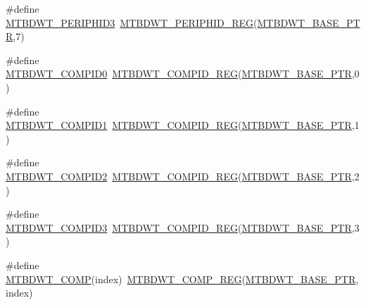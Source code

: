\begin{DoxyCompactItemize}
\item 
\#define \hyperlink{group___m_t_b_d_w_t___register___accessor___macros_ga6496ee3e7267206af1ef1f6118c0bbcf}{M\+T\+B\+D\+W\+T\+\_\+\+P\+E\+R\+I\+P\+H\+I\+D3}~\hyperlink{group___m_t_b_d_w_t___register___accessor___macros_ga91f7c6dfb35fc0d26fb6b3fae63757fc}{M\+T\+B\+D\+W\+T\+\_\+\+P\+E\+R\+I\+P\+H\+I\+D\+\_\+\+R\+EG}(\hyperlink{group___m_t_b_d_w_t___peripheral_ga97d048bfb5a11293a38c444b8347ff42}{M\+T\+B\+D\+W\+T\+\_\+\+B\+A\+S\+E\+\_\+\+P\+TR},7)
\item 
\#define \hyperlink{group___m_t_b_d_w_t___register___accessor___macros_gabea41b046757f76e965573ba1205b5b2}{M\+T\+B\+D\+W\+T\+\_\+\+C\+O\+M\+P\+I\+D0}~\hyperlink{group___m_t_b_d_w_t___register___accessor___macros_gaaeee0c6c32b2caddaf8ec3a96b430de0}{M\+T\+B\+D\+W\+T\+\_\+\+C\+O\+M\+P\+I\+D\+\_\+\+R\+EG}(\hyperlink{group___m_t_b_d_w_t___peripheral_ga97d048bfb5a11293a38c444b8347ff42}{M\+T\+B\+D\+W\+T\+\_\+\+B\+A\+S\+E\+\_\+\+P\+TR},0)
\item 
\#define \hyperlink{group___m_t_b_d_w_t___register___accessor___macros_gad1e9f6c3c5eeeeab187787e6eff15d4e}{M\+T\+B\+D\+W\+T\+\_\+\+C\+O\+M\+P\+I\+D1}~\hyperlink{group___m_t_b_d_w_t___register___accessor___macros_gaaeee0c6c32b2caddaf8ec3a96b430de0}{M\+T\+B\+D\+W\+T\+\_\+\+C\+O\+M\+P\+I\+D\+\_\+\+R\+EG}(\hyperlink{group___m_t_b_d_w_t___peripheral_ga97d048bfb5a11293a38c444b8347ff42}{M\+T\+B\+D\+W\+T\+\_\+\+B\+A\+S\+E\+\_\+\+P\+TR},1)
\item 
\#define \hyperlink{group___m_t_b_d_w_t___register___accessor___macros_gade8bf5b51854635778d28fbb31174a12}{M\+T\+B\+D\+W\+T\+\_\+\+C\+O\+M\+P\+I\+D2}~\hyperlink{group___m_t_b_d_w_t___register___accessor___macros_gaaeee0c6c32b2caddaf8ec3a96b430de0}{M\+T\+B\+D\+W\+T\+\_\+\+C\+O\+M\+P\+I\+D\+\_\+\+R\+EG}(\hyperlink{group___m_t_b_d_w_t___peripheral_ga97d048bfb5a11293a38c444b8347ff42}{M\+T\+B\+D\+W\+T\+\_\+\+B\+A\+S\+E\+\_\+\+P\+TR},2)
\item 
\#define \hyperlink{group___m_t_b_d_w_t___register___accessor___macros_ga3a9bd5acf838d38819681843c6fea66f}{M\+T\+B\+D\+W\+T\+\_\+\+C\+O\+M\+P\+I\+D3}~\hyperlink{group___m_t_b_d_w_t___register___accessor___macros_gaaeee0c6c32b2caddaf8ec3a96b430de0}{M\+T\+B\+D\+W\+T\+\_\+\+C\+O\+M\+P\+I\+D\+\_\+\+R\+EG}(\hyperlink{group___m_t_b_d_w_t___peripheral_ga97d048bfb5a11293a38c444b8347ff42}{M\+T\+B\+D\+W\+T\+\_\+\+B\+A\+S\+E\+\_\+\+P\+TR},3)
\item 
\#define \hyperlink{group___m_t_b_d_w_t___register___accessor___macros_ga66a9e86272e57446b4e31c0cdf57c400}{M\+T\+B\+D\+W\+T\+\_\+\+C\+O\+MP}(index)~\hyperlink{group___m_t_b_d_w_t___register___accessor___macros_ga0204594297d9a6d44fe19d610913a7aa}{M\+T\+B\+D\+W\+T\+\_\+\+C\+O\+M\+P\+\_\+\+R\+EG}(\hyperlink{group___m_t_b_d_w_t___peripheral_ga97d048bfb5a11293a38c444b8347ff42}{M\+T\+B\+D\+W\+T\+\_\+\+B\+A\+S\+E\+\_\+\+P\+TR},index)

\end{DoxyCompactItemize}
